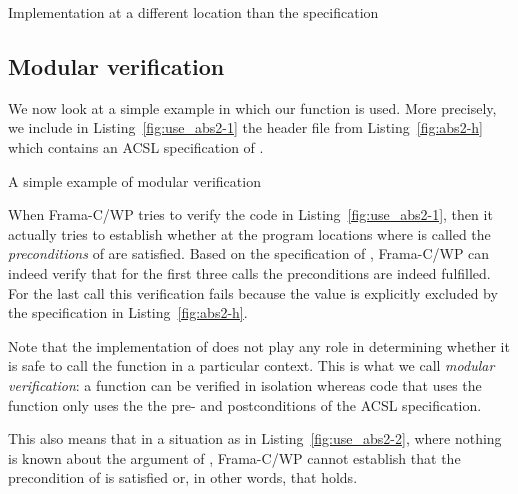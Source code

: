 \begin{listing}[hbt]
\begin{minipage}{\textwidth}

\end{minipage}
\caption{\label{fig:abs2-c} Implementation at a different location than the specification}
\end{listing}

\clearpage

\subsection{Modular verification}

We now look at a simple example in which our function  is used.
More precisely, we include in Listing~\ref{fig:use_abs2-1} the
header file from Listing~\ref{fig:abs2-h} which contains an ACSL specification of .

\begin{listing}[hbt]
\begin{minipage}{\textwidth}

\end{minipage}
\caption{\label{fig:use_abs2-1} A simple example of modular verification}
\end{listing}

\FloatBarrier

When Frama-C\slash WP tries to verify the code in Listing~\ref{fig:use_abs2-1},
then it actually tries to establish whether at the program locations where  
is called the \emph{preconditions} of  are satisfied.
Based on the specification of ,
Frama-C\slash WP can indeed verify that for the first three calls 
the preconditions are indeed fulfilled.
For the last call this verification fails because the value 
is explicitly excluded by the specification in Listing~\ref{fig:abs2-h}.

Note that the implementation of  does not play any role in determining
whether it is safe to call the function in a particular context.
This is what we call \emph{modular verification}: a function can be verified in
isolation whereas code that uses the function only uses the the pre- and postconditions
of the ACSL specification.

This also means that in a situation as in Listing~\ref{fig:use_abs2-2},
where nothing is known about the argument of , 
Frama-C\slash WP cannot establish that the precondition of  is satisfied
or, in other words, that  holds.

